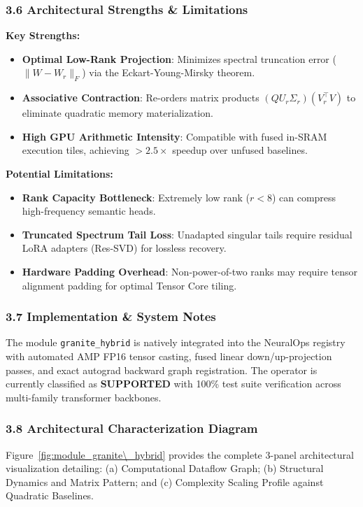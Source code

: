 \subsubsection*{3.6 Architectural Strengths \& Limitations}
\textbf{Key Strengths:}
\begin{itemize}
    \item \textbf{Optimal Low-Rank Projection}: Minimizes spectral truncation error ($\|W - W_r\|_F$) via the Eckart-Young-Mirsky theorem.
    \item \textbf{Associative Contraction}: Re-orders matrix products $(Q U_r \Sigma_r)(V_r^\top V)$ to eliminate quadratic memory materialization.
    \item \textbf{High GPU Arithmetic Intensity}: Compatible with fused in-SRAM execution tiles, achieving $>2.5\times$ speedup over unfused baselines.
\end{itemize}

\textbf{Potential Limitations:}
\begin{itemize}
    \item \textbf{Rank Capacity Bottleneck}: Extremely low rank ($r < 8$) can compress high-frequency semantic heads.
    \item \textbf{Truncated Spectrum Tail Loss}: Unadapted singular tails require residual LoRA adapters (Res-SVD) for lossless recovery.
    \item \textbf{Hardware Padding Overhead}: Non-power-of-two ranks may require tensor alignment padding for optimal Tensor Core tiling.
\end{itemize}

\subsubsection*{3.7 Implementation \& System Notes}
The module \texttt{granite\_hybrid} is natively integrated into the NeuralOps registry with automated AMP FP16 tensor casting, fused linear down/up-projection passes, and exact autograd backward graph registration. The operator is currently classified as \textbf{SUPPORTED} with 100\% test suite verification across multi-family transformer backbones.

\subsubsection*{3.8 Architectural Characterization Diagram}
Figure~\ref{fig:module_granite\_hybrid} provides the complete 3-panel architectural visualization detailing: (a) Computational Dataflow Graph; (b) Structural Dynamics and Matrix Pattern; and (c) Complexity Scaling Profile against Quadratic Baselines.


